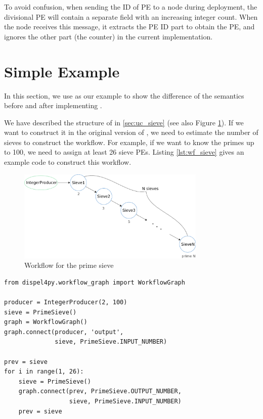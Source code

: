 To avoid confusion, when sending the ID of PE to a node during deployment, the divisional PE will contain a separate field with an increasing integer count. When the node receives this message, it extracts the PE ID part to obtain the PE, and ignores the other part (\ie the counter) in the current implementation.

\section{Simple Example} \label{sec:dynexp_example}
In this section, we use \ttsieve as our example to show the difference of the semantics before and after implementing \tdynexp.

We have described the structure of \ttsieve in \ref{sec:uc_sieve} (see also Figure \ref{fig:sieve_static}). If we want to construct it in the original version of \dpy, we need to estimate the number of sieves to construct the workflow. For example, if we want to know the primes up to 100, we need to assign at least 26 sieve PEs. Listing \ref{lst:wf_sieve} gives an example code to construct this workflow.

\begin{figure}[h]\centering
    \includegraphics[width=0.8\textwidth]{figures/sieve_static}
	\caption{Workflow for the prime sieve}	\label{fig:sieve_static}
\end{figure}

\begin{lstlisting}[frame=single,caption={Example code of the sieve workflow construction in the old semantics (suppose IntegerProducer and PrimeSieve are already defined},captionpos=b,label={lst:wf_sieve}]
from dispel4py.workflow_graph import WorkflowGraph

producer = IntegerProducer(2, 100)
sieve = PrimeSieve()
graph = WorkflowGraph()
graph.connect(producer, 'output',
              sieve, PrimeSieve.INPUT_NUMBER)

prev = sieve
for i in range(1, 26):
    sieve = PrimeSieve()
    graph.connect(prev, PrimeSieve.OUTPUT_NUMBER,
                  sieve, PrimeSieve.INPUT_NUMBER)
    prev = sieve
\end{lstlisting}

